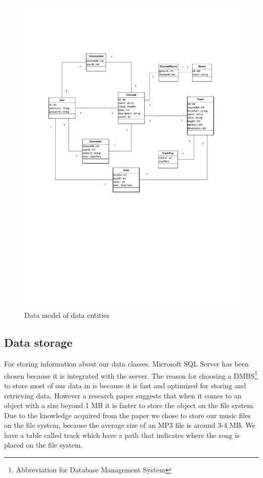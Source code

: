 \documentclass[a4paper,11pt,report]{article}
\begin{document}
\begin{figure}[H]
  \centering
\includegraphics[width=420pt,keepaspectratio=true,trim=60pt 300pt 60pt 80pt]{./ermodel.pdf}
\caption{Data model of data entities}
\end{figure}
\subsection{Data storage}
For storing information about our data classes. Microsoft SQL Server has been chosen because it is integrated with the server. The reason for choosing a DMBS\footnote[1]{Abbreviation for Database Management System} to store most of our data in is because it is fast and optimized for storing and retrieving data. However a research paper\cite{Russel} suggests that when it comes to an object with a size beyond 1 MB it is faster to store the object on the file system. Due to the knowledge acquired from the paper we chose to store our music files on the file system, because the average size of an MP3 file is around 3-4 MB. We have a table called track which have a path that indicates where the song is placed on the file system.
\end{document}
